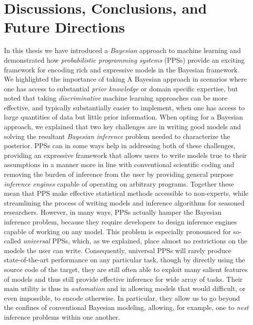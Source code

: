 
\chapter{Discussions, Conclusions, and Future Directions}
\label{chp:discussion}

In this thesis we have introduced a \emph{Bayesian} approach to machine learning and demonstrated
how \emph{probabilistic programming systems} (PPSs) provide an exciting framework for
encoding rich and expressive models in the Bayesian framework.  
We highlighted the importance of taking A Bayesian approach in scenarios where one has
access to substantial \emph{prior knowledge} or domain specific expertise, but noted that taking
\emph{discriminative} machine learning approaches can be more effective, and typically substantially
easier to implement, when one has access to large quantities of data but little prior information.
When opting for a Bayesian approach, we explained that two key challenges are in writing good models
and solving the resultant \emph{Bayesian inference} problem needed to characterize the posterior.
PPSs can in some ways help in addressing both of these challenges, providing an expressive framework
that allows users to write models true to their assumptions in a manner more in line with conventional
scientific coding and removing the burden of inference from the user by providing general
purpose \emph{inference engines} capable of operating on arbitrary programs.
Together these mean that PPS make effective statistical methods accessible to non-experts, while
streamlining the process of writing models and inference algorithms for seasoned researchers.
However, in many ways, PPSs actually hamper the Bayesian inference problem, because
they require developers to design inference engines capable of working on any model.
 This problem is especially pronounced
for so-called \emph{universal} PPSs, which, as we explained, place almost no restrictions on the
models the user can write.  Consequently,
universal PPSs will rarely produce state-of-the-art performance on any particular task, though
by directly using the source code of the target, they are still often able to exploit many salient
features of models and thus still provide effective inference for wide array of tasks.
  Their main
utility is thus in \emph{automation} and in allowing models that would difficult, or even impossible,
to encode otherwise.  In particular, they allow us to go beyond
the confines of conventional Bayesian  modeling, allowing, for example, one to \emph{nest} 
inference problems within one another.

